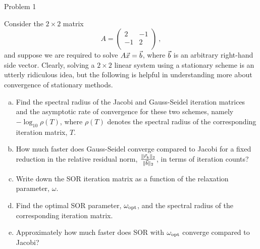 \begin{section}{Problem 1}

    \begin{problem}{1}
        Consider the $2 \times 2$ matrix
        $$
        A=\left( \begin{array}{cc}
        2 & -1   \\
        -1 & 2  \\
        \end{array} \right)
        \ ,
        $$
        and suppose we are required to solve $A \vec{x}=\vec{b}$, where $\vec{b}$ is an arbitrary right-hand side vector. Clearly, solving a $2
        \times 2$ linear system using a stationary scheme is an utterly ridiculous idea,
        but the following is helpful in understanding
            more about convergence of stationary methods.
        \begin{enumerate}[(a)]
            \item Find the spectral radius of the Jacobi and Gauss-Seidel iteration matrices and the asymptotic rate of convergence for these two schemes, namely $-\log_{10} \rho(T)$, where $\rho(T)$ denotes the spectral radius of the corresponding iteration matrix, $T$. 
            \item How much faster does Gauss-Seidel converge compared to Jacobi for a fixed reduction in the relative residual norm, $\frac{\| \vec{r}_k \|_2}{\| \vec{b} \|_2}$, in terms of iteration counts?
            \item Write down the SOR iteration matrix as a function of the relaxation parameter, $\omega$.  
            \item Find the optimal SOR parameter, $\omega_{\rm opt}$, and the spectral radius of the corresponding iteration matrix.
            \item Approximately how much faster does SOR with $\omega_{\rm opt}$ converge compared to Jacobi?
        \end{enumerate}
    \end{problem}


\end{section}
